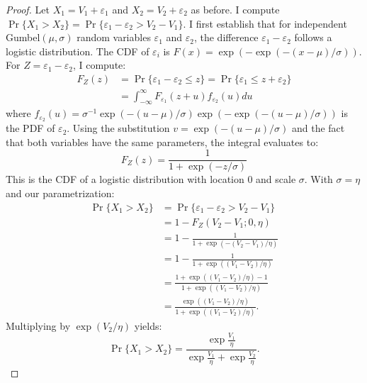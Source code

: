 \documentclass[12pt]{article}
\theoremstyle{plain}
\begin{document}
\begin{proof}
	Let $X_1 = V_1 + \varepsilon_1$ and $X_2 = V_2 + \varepsilon_2$ as before. I compute $\Pr\{X_1 > X_2\} = \Pr\{\varepsilon_1 - \varepsilon_2 > V_2 - V_1\}$. I first establish that for independent Gumbel$(\mu, \sigma)$ random variables
	$\varepsilon_1$ and $\varepsilon_2$, the difference $\varepsilon_1 -
		\varepsilon_2$ follows a logistic distribution. The CDF of $\varepsilon_i$ is
	$F(x) = \exp(-\exp(-(x-\mu)/\sigma))$. For $Z = \varepsilon_1 - \varepsilon_2$,
	I compute:
	\begin{align*}
		F_Z(z) & = \Pr\{\varepsilon_1 - \varepsilon_2 \leq z\} = \Pr\{\varepsilon_1 \leq z + \varepsilon_2\} \\
		       & = \int_{-\infty}^{\infty} F_{\varepsilon_1}(z + u) f_{\varepsilon_2}(u) du
	\end{align*}
	where $f_{\varepsilon_2}(u) = \sigma^{-1}\exp(-(u-\mu)/\sigma)\exp(-\exp(-(u-\mu)/\sigma))$ is the PDF of $\varepsilon_2$. Using the substitution $v = \exp(-(u-\mu)/\sigma)$ and the fact that both variables have the same parameters, the integral evaluates to:
	\begin{equation*}
		F_Z(z) = \frac{1}{1 + \exp(-z/\sigma)}
	\end{equation*}
	This is the CDF of a logistic distribution with location 0 and scale $\sigma$.	With $\sigma = \eta$ and our parametrization:
	\begin{align*}
		\Pr\{X_1 > X_2\} & = \Pr\{\varepsilon_1 - \varepsilon_2 > V_2 - V_1\}                  \\
		                 & = 1 - F_{Z}(V_2 - V_1; 0, \eta)                                     \\
		                 & = 1 - \frac{1}{1 + \exp(-(V_2 - V_1)/\eta)}                         \\
		                 & = 1 - \frac{1}{1 + \exp((V_1 - V_2)/\eta)}                          \\
		                 & = \frac{1 + \exp((V_1 - V_2)/\eta) - 1}{1 + \exp((V_1 - V_2)/\eta)} \\
		                 & = \frac{\exp((V_1 - V_2)/\eta)}{1 + \exp((V_1 - V_2)/\eta)}.
	\end{align*}
	Multiplying by $\exp(V_2/\eta)$ yields:
	\begin{equation*}
		\Pr\{X_1 > X_2\} = \frac{\exp\frac{V_1}{\eta}}{\exp\frac{V_1}{\eta} + \exp\frac{V_2}{\eta}}.
	\end{equation*}
\end{proof}
\end{document}
